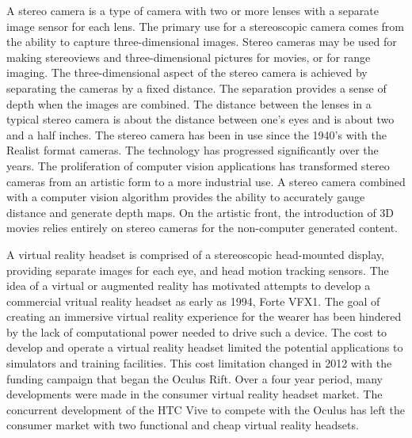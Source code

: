 A stereo camera is a type of camera with two or more lenses with a separate image sensor for each lens. The primary use for a stereoscopic camera comes from the ability to capture three-dimensional images. Stereo cameras may be used for making stereoviews and three-dimensional pictures for movies, or for range imaging. The three-dimensional aspect of the stereo camera is achieved by separating the cameras by a fixed distance. The separation provides a sense of depth when the images are combined. The distance between the lenses in a typical stereo camera is about the distance between one's eyes and is about two and a half inches. The stereo camera has been in use since the 1940's with the Realist format cameras. The technology has progressed significantly over the years. The proliferation of computer vision applications has transformed stereo cameras from an artistic form to a more industrial use. A stereo camera combined with a computer vision algorithm provides the ability to accurately gauge distance and generate depth maps. On the artistic front, the introduction of 3D movies relies entirely on stereo cameras for the non-computer generated content.

A virtual reality headset is comprised of a stereoscopic head-mounted display, providing separate images for each eye, and head motion tracking sensors. The idea of a virtual or augmented reality has motivated attempts to develop a commercial vritual reality headset as early as 1994, Forte VFX1. The goal of creating an immersive virtual reality experience for the wearer has been hindered by the lack of computational power needed to drive such a device. The cost to develop and operate a virtual reality headset limited the potential applications to simulators and training facilities. This cost limitation changed in 2012 with the funding campaign that began the Oculus Rift. Over a four year period, many developments were made in the consumer virtual reality headset market. The concurrent development of the HTC Vive to compete with the Oculus has left the consumer market with two functional and cheap virtual reality headsets.
